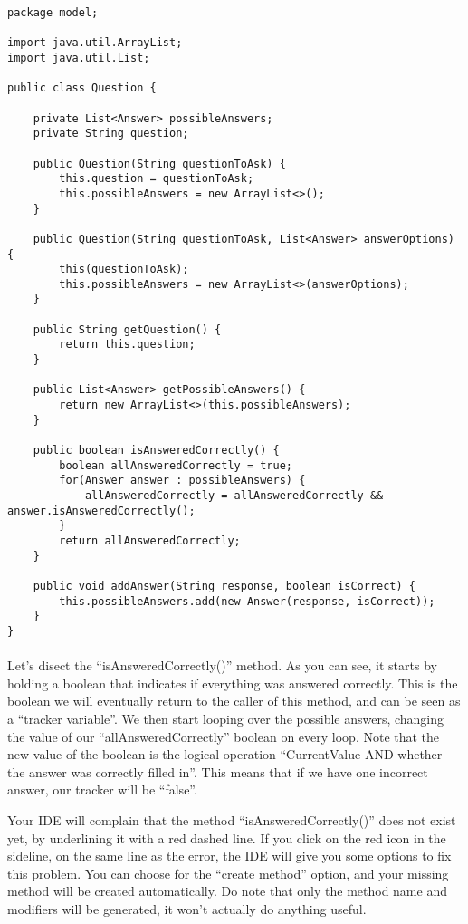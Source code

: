 \documentclass[11pt,fleqn]{book} %
\begin{document}
\begin{lstlisting}
package model;

import java.util.ArrayList;
import java.util.List;

public class Question {
	
	private List<Answer> possibleAnswers;
	private String question;
	
	public Question(String questionToAsk) {
		this.question = questionToAsk;
		this.possibleAnswers = new ArrayList<>();
	}
	
	public Question(String questionToAsk, List<Answer> answerOptions) {
		this(questionToAsk);
		this.possibleAnswers = new ArrayList<>(answerOptions);
	}
	
	public String getQuestion() {
		return this.question;
	}
	
	public List<Answer> getPossibleAnswers() {
		return new ArrayList<>(this.possibleAnswers);
	}
	
	public boolean isAnsweredCorrectly() {
		boolean allAnsweredCorrectly = true;
		for(Answer answer : possibleAnswers) {
			allAnsweredCorrectly = allAnsweredCorrectly && answer.isAnsweredCorrectly();
		}
		return allAnsweredCorrectly;
	}

	public void addAnswer(String response, boolean isCorrect) {
		this.possibleAnswers.add(new Answer(response, isCorrect));
	}
}

\end{lstlisting}
\paragraph{} Let's disect the ``isAnsweredCorrectly()'' method. As you can see, it starts by holding a boolean that indicates if everything was answered correctly. This is the boolean we will eventually return to the caller of this method, and can be seen as a ``tracker variable''. We then start looping over the possible answers, changing the value of our ``allAnsweredCorrectly'' boolean on every loop. Note that the new value of the boolean is the logical operation ``CurrentValue AND whether the answer was correctly filled in''. This means that if we have one incorrect answer, our tracker will be ``false''.

\begin{remark}
	Your IDE will complain that the method ``isAnsweredCorrectly()'' does not exist yet, by underlining it with a red dashed line. If you click on the red icon in the sideline, on the same line as the error, the IDE will give you some options to fix this problem. You can choose for the ``create method'' option, and your missing method will be created automatically. Do note that only the method name and modifiers will be generated, it won't actually do anything useful.
\end{remark}
\end{document}
